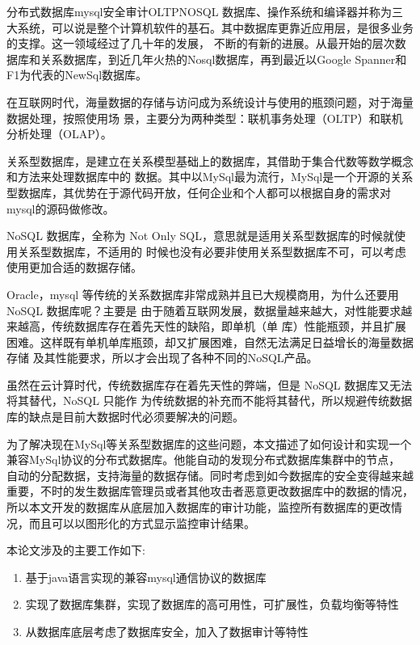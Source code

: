 
\begin{Cabstract}{分布式数据库}{mysql}{安全审计}{OLTP}{NOSQL}
数据库、操作系统和编译器并称为三大系统，可以说是整个计算机软件的基石。其中数据库更靠近应用层，是很多业务的支撑。这一领域经过了几十年的发展，
不断的有新的进展。从最开始的层次数据库和关系数据库，到近几年火热的Nosql数据库，再到最近以Google Spanner和F1为代表的NewSql数据库。

在互联网时代，海量数据的存储与访问成为系统设计与使用的瓶颈问题，对于海量数据处理，按照使用场
景，主要分为两种类型：联机事务处理（OLTP）和联机分析处理（OLAP）。

关系型数据库，是建立在关系模型基础上的数据库，其借助于集合代数等数学概念和方法来处理数据库中的
数据。其中以MySql最为流行，MySql是一个开源的关系型数据库，其优势在于源代码开放，任何企业和个人都可以根据自身的需求对mysql的源码做修改。

NoSQL 数据库，全称为 Not Only SQL，意思就是适用关系型数据库的时候就使用关系型数据库，不适用的
时候也没有必要非使用关系型数据库不可，可以考虑使用更加合适的数据存储。

Oracle，mysql 等传统的关系数据库非常成熟并且已大规模商用，为什么还要用 NoSQL 数据库呢？主要是
由于随着互联网发展，数据量越来越大，对性能要求越来越高，传统数据库存在着先天性的缺陷，即单机（单
库）性能瓶颈，并且扩展困难。这样既有单机单库瓶颈，却又扩展困难，自然无法满足日益增长的海量数据存储
及其性能要求，所以才会出现了各种不同的NoSQL产品。

虽然在云计算时代，传统数据库存在着先天性的弊端，但是 NoSQL 数据库又无法将其替代，NoSQL 只能作
为传统数据的补充而不能将其替代，所以规避传统数据库的缺点是目前大数据时代必须要解决的问题。

为了解决现在MySql等关系型数据库的这些问题，本文描述了如何设计和实现一个兼容MySql协议的分布式数据库。他能自动的发现分布式数据库集群中的节点，
自动的分配数据，支持海量的数据存储。同时考虑到如今数据库的安全变得越来越重要，不时的发生数据库管理员或者其他攻击者恶意更改数据库中的数据的情况，
所以本文开发的数据库从底层加入数据库的审计功能，监控所有数据库的更改情况，而且可以以图形化的方式显示监控审计结果。

本论文涉及的主要工作如下:
\begin{enumerate}
\item 基于java语言实现的兼容mysql通信协议的数据库
\item 实现了数据库集群，实现了数据库的高可用性，可扩展性，负载均衡等特性
\item 从数据库底层考虑了数据库安全，加入了数据审计等特性
\end{enumerate}
 \hspace{8mm}
\end{Cabstract}